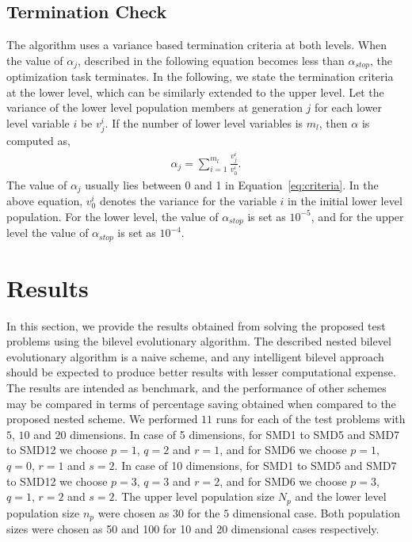 \documentclass[twoside]{article}
\begin{document}
\subsection{Termination Check}
\label{sec:termination}
The algorithm uses a variance based termination criteria at both levels. When the value of $\alpha_j$, described in the following equation becomes less than $\alpha_{stop}$, the optimization task terminates. In the following, we state the termination criteria at the lower level, which can be similarly extended to the upper level. Let the variance of the lower level population members at generation $j$ for each lower level variable $i$ be $v_{j}^{i}$. If the number of lower level variables is $m_l$, then $\alpha$ is computed as,
\begin{equation}
\begin{array}{l}
	\alpha_j = \sum_{i=1}^{m_l} \frac{v_{j}^i}{v_{0}^i}.
\label{eq:criteria}
\end{array}
\end{equation}
The value of $\alpha_j$ usually lies between 0 and 1 in Equation~\ref{eq:criteria}. In the above equation, $v_{0}^i$ denotes the variance for the variable $i$ in the initial lower level population. For the lower level, the value of $\alpha_{stop}$ is set as $10^{-5}$, and for the upper level the value of $\alpha_{stop}$ is set as $10^{-4}$.

\section{Results}\label{sec:results}
In this section, we provide the results obtained from solving the proposed test problems using the bilevel evolutionary algorithm. The described nested bilevel evolutionary algorithm is a naive scheme, and any intelligent bilevel approach should be expected to produce better results with lesser computational expense. The results are intended as benchmark, and the performance of other schemes may be compared in terms of percentage saving obtained when compared to the proposed nested scheme. We performed $11$ runs for each of the test problems with $5$, $10$ and $20$ dimensions. In case of 5 dimensions, for SMD1 to SMD5 and SMD7 to SMD12 we choose $p=1$, $q=2$ and $r=1$, and for SMD6 we choose $p=1$, $q=0$, $r=1$ and $s=2$. In case of 10 dimensions, for SMD1 to SMD5 and SMD7 to SMD12 we choose $p=3$, $q=3$ and $r=2$, and for SMD6 we choose $p=3$, $q=1$, $r=2$ and $s=2$. The upper level population size $N_p$ and the lower level population size $n_p$ were chosen as 30 for the $5$ dimensional case. Both population sizes were chosen as 50 and 100 for 10 and 20 dimensional cases respectively.
\end{document}
